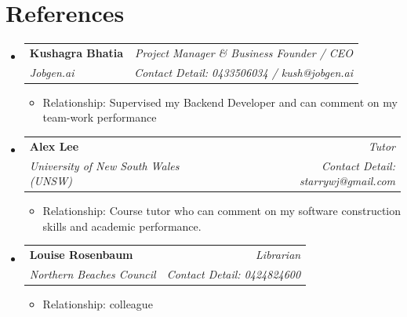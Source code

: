 \documentclass[10pt, a4paper]{article}
\makeatletter
\newcommand{\resumeItem}[1]{
  \item\small{
    {#1 \vspace{-2pt}}
  }
}
\newcommand{\resumeReferee}[5]{
  \vspace{-1pt}\item
    \begin{tabular*}{0.97\textwidth}[t]{l@{\extracolsep{\fill}}r}
      \textbf{#1} & \textit{\small #2} \\
      \textit{\small #3} & \textit{\small #4} \\
    \end{tabular*}\vspace{-5pt}
    \begin{itemize}[leftmargin=0.15in]
      \resumeItem{Relationship: #5}
    \end{itemize}
}
\newenvironment{resumeItemList}{\begin{itemize}[leftmargin=0.15in, label={}]}{\end{itemize}}
\makeatother
\begin{document}
\section{References}
\begin{resumeItemList}
  \resumeReferee
    {Kushagra Bhatia}{Project Manager \& Business Founder / CEO}
    {Jobgen.ai}{Contact Detail: 0433506034 / kush@jobgen.ai}
    {Supervised my Backend Developer and can comment on my team-work performance}

  \resumeReferee
    {Alex Lee}{Tutor}
    {University of New South Wales (UNSW)}{Contact Detail: starrywj@gmail.com}
    {Course tutor who can comment on my software construction skills and academic performance.}

  \resumeReferee
    {Louise Rosenbaum}{Librarian}
    {Northern Beaches Council}{Contact Detail: 0424824600}
    {colleague}
\end{resumeItemList}
\end{document}
